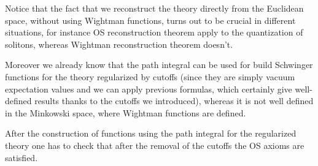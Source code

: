 \documentclass[../main/main.tex]{subfiles}
\begin{document}
Notice that the fact that we reconstruct the theory directly from the Euclidean space, without using Wightman functions, turns out to be crucial in different situations, for instance OS reconstruction theorem apply to the quantization of solitons, whereas Wightman reconstruction theorem doesn't. 

Moreover we already know that the path integral can be used for build Schwinger functions for the theory regularized by cutoffs (since they are simply vacuum expectation values and we can apply previous formulas, which certainly give well-defined results thanks to the cutoffs we introduced), whereas it is not well defined in the Minkowski space, where Wightman functions are defined. 

After the construction of functions using the path integral for the regularized theory one has to check that after the removal of the cutoffs the OS axioms are satisfied. 
\end{document}
